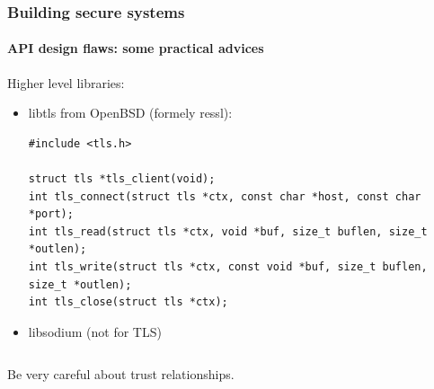 \documentclass[12pt,t]{beamer}
\begin{document}
\begin{frame}[fragile]
\frametitle{Building secure systems}
\framesubtitle{API design flaws: some practical advices}
Higher level libraries:
\begin{itemize}
\item libtls from OpenBSD (formely ressl):
\begin{tiny}
\begin{verbatim}
#include <tls.h>

struct tls *tls_client(void);
int tls_connect(struct tls *ctx, const char *host, const char *port);
int tls_read(struct tls *ctx, void *buf, size_t buflen, size_t *outlen);
int tls_write(struct tls *ctx, const void *buf, size_t buflen, size_t *outlen);
int tls_close(struct tls *ctx);
\end{verbatim}
\end{tiny}
\item libsodium (not for TLS)
\begin{tiny}
\begin{verbatim}

\end{verbatim}
\end{tiny}
\end{itemize}
Be very careful about trust relationships.
\end{frame}
\end{document}
